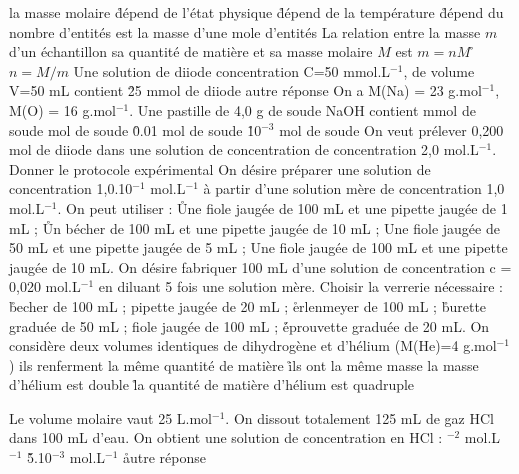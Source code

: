 \q la masse molaire 
\r dépend de l'état physique 
\r dépend de la température 
\r dépend du nombre d'entités 
\rv est la masse d'une mole d'entités 
\q La relation entre la masse $m$ d'un échantillon sa quantité de matière et sa masse molaire $M$ est
\rv
$m=nM$
\r
$n=M/m$
\q Une solution de diiode concentration C=50 mmol.L$^{-1}$, de volume V=50 mL contient
\r
25 mmol de diiode
\rv
autre réponse
\q On a M(Na) = 23 g.mol$^{-1}$, M(O) = 16 g.mol$^{-1}$. Une pastille de 4,0 g de soude NaOH contient 
 mmol de soude
 mol de soude
\r
0.01 mol de soude
\r 
10$^{-3}$ mol de soude
\q On veut prélever 0,200 mol de diiode dans une solution de concentration de concentration 2,0 mol.L$^{-1}$. Donner le protocole expérimental
\q	
On désire préparer une solution de concentration 1,0.10$^{-1}$ mol.L$^{-1}$ à partir  d'une solution mère de concentration 1,0 mol.L$^{-1}$.  On peut utiliser :
\r
Une fiole jaugée de 100 mL et une pipette jaugée de 1 mL ;
\r
Un bécher de 100 mL et une pipette jaugée de 10 mL ;
\rv
Une fiole jaugée de 50 mL et une pipette jaugée de 5 mL ;
\rv
Une fiole jaugée de 100 mL et une pipette jaugée de 10 mL.
\q	
On désire fabriquer 100 mL d'une solution de concentration   c = 0,020 mol.L$^{-1}$ en diluant 5 fois une solution mère. Choisir la verrerie nécessaire :
\r
becher de 100 mL ;		
\rv
pipette jaugée de 20 mL ;
\r
erlenmeyer de 100 mL ;	
\r
burette graduée de 50 mL ;
\rv
fiole jaugée de 100 mL ; 
\r
éprouvette graduée de 20 mL.
\q  On considère deux volumes identiques de dihydrogène et d'hélium (M(He)=4 g.mol$^{-1}$)
\rv ils renferment la même quantité de matière
\r ils ont la même masse
\rv la masse d'hélium est double
\r la quantité de matière d'hélium est quadruple 

\q Le volume molaire vaut 25 L.mol$^{-1}$. On dissout totalement 125 mL de gaz HCl dans 100 mL d'eau. On obtient une solution de concentration en HCl :
$^{-2}$ mol.L$^{-1}$
\r 5.10$^{-3}$ mol.L$^{-1}$
\r autre réponse
 
